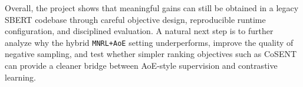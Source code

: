 \documentclass[letterpaper]{article} %
\begin{document}
Overall, the project shows that meaningful gains can still be obtained in a legacy SBERT codebase
through careful objective design, reproducible runtime configuration, and disciplined evaluation. A
natural next step is to further analyze why the hybrid \texttt{MNRL+AoE} setting underperforms,
improve the quality of negative sampling, and test whether simpler ranking objectives such as CoSENT
can provide a cleaner bridge between AoE-style supervision and contrastive learning.

\bigskip


\end{document}

